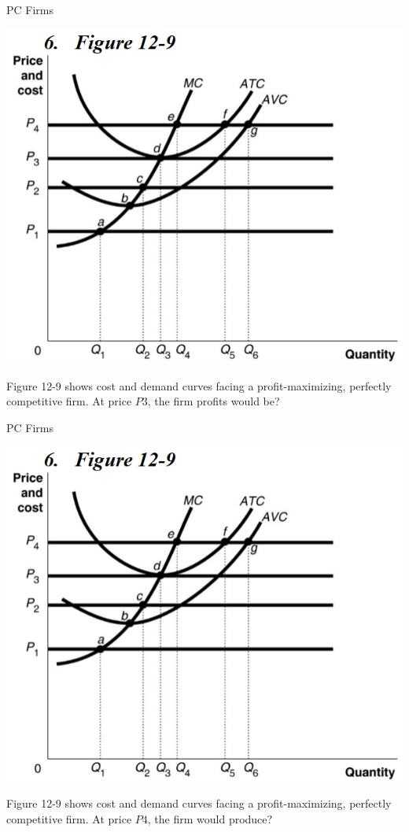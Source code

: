 \documentclass{beamer}
\begin{document}
\begin{frame}[t]{PC Firms}
    \begin{center}
        \includegraphics[scale=.6]{images/graph.png}
    \end{center}
    \newline
    Figure 12-9 shows cost and demand curves facing a profit-maximizing, perfectly competitive firm. At price $P3$, the firm profits would be?
\end{frame}

\begin{frame}[t]{PC Firms}
    \begin{center}
        \includegraphics[scale=.6]{images/graph.png}
    \end{center}
    \newline
    Figure 12-9 shows cost and demand curves facing a profit-maximizing, perfectly competitive firm. At price $P4$, the firm would produce?
\end{frame}
\end{document}

